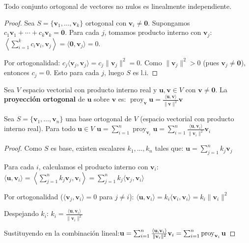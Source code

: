 \begin{theorem}
Todo conjunto ortogonal de vectores no nulos es linealmente independiente.
\end{theorem}

\begin{proof}
Sea $S = \{ \mathbf{v}_1, \dots, \mathbf{v}_k \}$ ortogonal con $\mathbf{v}_i \neq \mathbf{0}$. Supongamos \(
c_1 \mathbf{v}_1 + \cdots + c_k \mathbf{v}_k = \mathbf{0}
.\) Para cada $j$, tomamos producto interno con $\mathbf{v}_j$: \(
\left\langle \sum_{i=1}^k c_i \mathbf{v}_i, \mathbf{v}_j \right\rangle = \langle \mathbf{0}, \mathbf{v}_j \rangle = 0.
\)

Por ortogonalidad: \(
c_j \langle \mathbf{v}_j, \mathbf{v}_j \rangle = c_j \|\mathbf{v}_j\|^2 = 0
.\) Como $\|\mathbf{v}_j\|^2 > 0$ (pues $\mathbf{v}_j \neq \mathbf{0}$), entonces $c_j = 0$. Esto para cada $j$, luego $S$ es l.i.
\end{proof}


\begin{definition}
Sea $V$ espacio vectorial con producto interno real y $\mathbf{u}, \mathbf{v} \in V$ con $\mathbf{v} \neq \mathbf{0}$. La \textbf{proyección ortogonal} de $\mathbf{u}$ sobre $\mathbf{v}$ es: \(
\operatorname{proy}_{\mathbf{v}} \mathbf{u} = \frac{\langle \mathbf{u}, \mathbf{v} \rangle}{\|\mathbf{v}\|^2} \mathbf{v}
\)
\end{definition}

\begin{theorem}
Sea $S = \{ \mathbf{v}_1, \dots, \mathbf{v}_n \}$ una base ortogonal de $V$ (espacio vectorial con producto interno real). Para todo $\mathbf{u} \in V$ \(
\mathbf{u} = \sum_{i=1}^n \operatorname{proy}_{\mathbf{v}_i} \mathbf{u} = \sum_{i=1}^n \frac{\langle \mathbf{u}, \mathbf{v}_i \rangle}{\|\mathbf{v}_i\|^2} \mathbf{v}_i
\)
\begin{proof}
Como $S$ es base, existen escalares $k_1, \dots, k_n$ tales que: \(
\mathbf{u} = \sum_{j=1}^n k_j \mathbf{v}_j
\)

Para cada $i$, calculamos el producto interno con $\mathbf{v}_i$: \(
\langle \mathbf{u}, \mathbf{v}_i \rangle = \left\langle \sum_{j=1}^n k_j \mathbf{v}_j, \mathbf{v}_i \right\rangle = \sum_{j=1}^n k_j \langle \mathbf{v}_j, \mathbf{v}_i \rangle
\)

Por ortogonalidad ($\langle \mathbf{v}_j, \mathbf{v}_i \rangle = 0$ para $j \neq i$): \(
\langle \mathbf{u}, \mathbf{v}_i \rangle = k_i \langle \mathbf{v}_i, \mathbf{v}_i \rangle = k_i \|\mathbf{v}_i\|^2
\)


Despejando $k_i$: \(
k_i = \frac{\langle \mathbf{u}, \mathbf{v}_i \rangle}{\|\mathbf{v}_i\|^2}
\)


Sustituyendo en la combinación lineal:\(
\mathbf{u} = \sum_{i=1}^n \frac{\langle \mathbf{u}, \mathbf{v}_i \rangle}{\|\mathbf{v}_i\|^2} \mathbf{v}_i = \sum_{i=1}^n \operatorname{proy}_{\mathbf{v}_i} \mathbf{u} \qedhere
\)
\end{proof}
\end{theorem}

